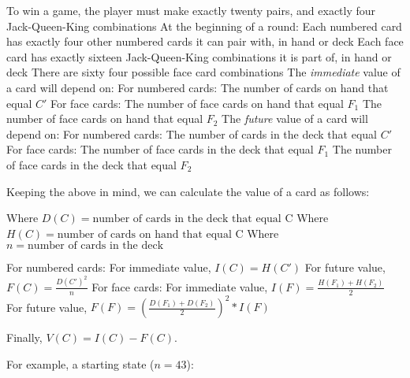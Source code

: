 \documentclass{article}
\begin{document}
\begin{outline}
  \1 To win a game, the player must make exactly twenty pairs, and exactly four Jack-Queen-King combinations
  \1 At the beginning of a round:
    \2 Each numbered card has exactly four other numbered cards it can pair with, in hand or deck
    \2 Each face card has exactly sixteen Jack-Queen-King combinations it is part of, in hand or deck
    \2 There are sixty four possible face card combinations
  \1 The \emph{immediate} value of a card will depend on:
    \2 For numbered cards:
      \3 The number of cards on hand that equal $C'$
    \2 For face cards:
      \3 The number of face cards on hand that equal $F_1$
      \3 The number of face cards on hand that equal $F_2$
  \1 The \emph{future} value of a card will depend on:
    \2 For numbered cards:
      \3 The number of cards in the deck that equal $C'$
    \2 For face cards:
      \3 The number of face cards in the deck that equal $F_1$
      \3 The number of face cards in the deck that equal $F_2$
\end{outline}

Keeping the above in mind, we can calculate the value of a card as follows:

\begin{outline}
  \1 Where $D(C) = \text{number of cards in the deck that equal C}$
  \1 Where $H(C) = \text{number of cards on hand that equal C}$
  \1 Where $n = \text{number of cards in the deck}$
\end{outline}

\begin{outline}
  \1 For numbered cards:
    \2 For immediate value, $I(C) = H(C')$
    \2 For future value, $F(C) = \frac{D(C')^2}{n}$
  \1 For face cards:
    \2 For immediate value, $I(F) = \frac{H(F_1) + H(F_2)}{2}$
    \2 For future value, $F(F) = (\frac{D(F_1) + D(F_2)}{2})^2 * I(F)$
\end{outline}

Finally, $V(C) = I(C) - F(C)$.

For example, a starting state ($n = 43$):

\vspace{3mm}


\vspace{3mm}
\end{document}
